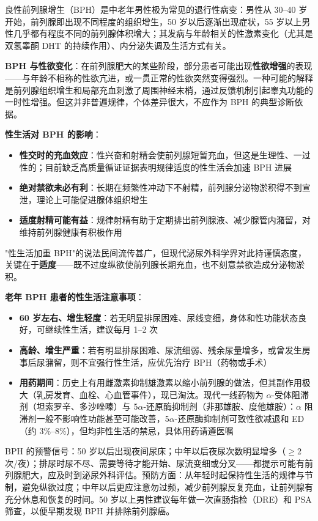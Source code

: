 \documentclass[12pt,a4paper,twoside]{ctexbook}
\begin{document}
良性前列腺增生（BPH）是中老年男性极为常见的退行性病变：男性从 30--40 岁开始，前列腺即出现不同程度的组织增生，50 岁以后逐渐出现症状，55 岁以上男性几乎都有程度不同的前列腺体积增大；其发病与年龄相关的性激素变化（尤其是双氢睾酮 DHT 的持续作用）、内分泌失调及生活方式有关。

\textbf{BPH 与性欲变化}：在前列腺肥大的某些阶段，部分患者可能出现\textbf{性欲增强}的表现——与年龄不相称的性欲亢进，或一贯正常的性欲突然变得强烈。一种可能的解释是前列腺组织增生和局部充血刺激了周围神经末梢，通过反馈机制引起睾丸功能的一时性增强。但这并非普遍规律，个体差异很大，不应作为 BPH 的典型诊断依据。

\textbf{性生活对 BPH 的影响}：
\begin{itemize}[leftmargin=2cm]
	\item \textbf{性交时的充血效应}：性兴奋和射精会使前列腺短暂充血，但这是生理性、一过性的；目前缺乏高质量循证证据表明规律适度的性生活会加速 BPH 进展
	\item \textbf{绝对禁欲未必有利}：长期在频繁性冲动下不射精，前列腺分泌物淤积得不到宣泄，理论上可能促进腺体组织增生
	\item \textbf{适度射精可能有益}：规律射精有助于定期排出前列腺液、减少腺管内潴留，对维持前列腺健康有积极作用
\end{itemize}

"性生活加重 BPH"的说法民间流传甚广，但现代泌尿外科学界对此持谨慎态度，关键在于\textbf{适度}——既不过度纵欲使前列腺长期充血，也不刻意禁欲造成分泌物淤积。

\textbf{老年 BPH 患者的性生活注意事项}：
\begin{itemize}[leftmargin=2cm]
	\item \textbf{60 岁左右、增生轻度}：若无明显排尿困难、尿线变细，身体和性功能状态良好，可继续性生活，建议每月 1--2 次
	\item \textbf{高龄、增生严重}：若有明显排尿困难、尿流细弱、残余尿量增多，或曾发生房事后尿潴留，则不宜强行性生活，应优先治疗 BPH（药物或手术）
	\item \textbf{用药期间}：历史上有用雌激素抑制雄激素以缩小前列腺的做法，但其副作用极大（乳房发育、血栓、心血管事件），现已淘汰。现代一线药物为 $\alpha$-受体阻滞剂（坦索罗辛、多沙唑嗪）与 5$\alpha$-还原酶抑制剂（非那雄胺、度他雄胺）：$\alpha$ 阻滞剂一般不影响性功能甚至可能改善，5$\alpha$-还原酶抑制剂可致性欲减退和 ED（约 3\%--8\%），但均非性生活的禁忌，具体用药请遵医嘱
\end{itemize}

\begin{tcolorbox}[colback=pink!5!white,colframe=red!50!black,title=贴心小叮咛]
BPH 的预警信号：50 岁以后出现夜间尿床；中年以后夜尿次数明显增多（$\geq$2 次/夜）；排尿时尿不尽、需要等待才能开始、尿流变细或分叉——都提示可能有前列腺肥大，应及时到泌尿外科评估。预防方面：从年轻时起保持性生活的规律与节制，避免纵欲过度；中年以后更应注意勿过频，减少前列腺反复充血，让前列腺有充分休息和恢复的时间。50 岁以上男性建议每年做一次直肠指检（DRE）和 PSA 筛查，以便早期发现 BPH 并排除前列腺癌。
\end{tcolorbox}
\end{document}
